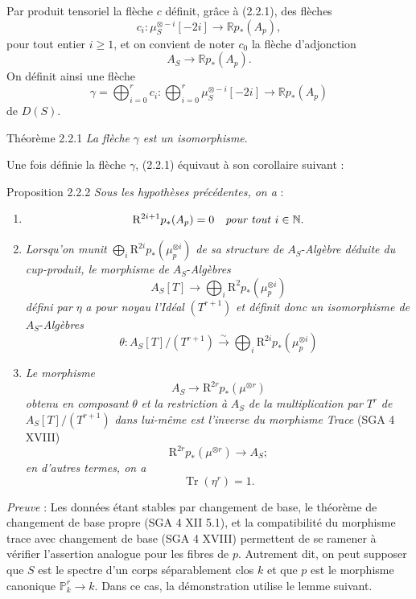 Par
produit tensoriel la flèche $c$ définit, grâce à (2.2.1), des flèches
\[
c_i:\mu_S^{\otimes -i}[-2i]\longrightarrow \mathbb{R} p_*(A_p),
\]
pour tout entier $i\ge1$, et on convient de noter $c_0$ la flèche d'adjonction
\[
A_S\longrightarrow \mathbb{R} p_*(A_p).
\]
On définit ainsi une flèche
\[
\gamma=\bigoplus_{i=0}^{r}c_i:
\bigoplus_{i=0}^{r}\mu_S^{\otimes -i}[-2i]\longrightarrow \mathbb{R} p_*(A_p)
\]
de $D(S)$.

\begin{statement}{Théorème 2.2.1}
\emph{La flèche} $\gamma$ \emph{est un isomorphisme}.
\end{statement}

Une fois définie la flèche $\gamma$, (2.2.1) équivaut à son corollaire suivant :

\begin{statement}{Proposition 2.2.2}
\emph{Sous les hypothèses précédentes, on a} :
\begin{enumerate}[label=\alph*)]
\item
\[
\mathrm{R}^{2i+1}p_*(A_p)=0\quad\text{\emph{pour tout} }i\in\mathbb{N}.
\]
\item \emph{Lorsqu'on munit} $\bigoplus_i \mathrm{R}^{2i}p_*(\mu_p^{\otimes i})$ \emph{de sa structure de} $A_S$-\emph{Algèbre déduite du cup-produit, le morphisme de} $A_S$-\emph{Algèbres}
\[
A_S[T]\longrightarrow \bigoplus_i \mathrm{R}^{2}p_*(\mu_p^{\otimes i})
\]
\emph{défini par} $\eta$ \emph{a pour noyau l'Idéal} $(T^{r+1})$ \emph{et définit donc un isomorphisme de} $A_S$-\emph{Algèbres}
\[
\theta:A_S[T]/(T^{r+1})\xrightarrow{\sim}\bigoplus_i \mathrm{R}^{2i}p_*(\mu_p^{\otimes i})
\]
\item \emph{Le morphisme}
\[
A_S\longrightarrow \mathrm{R}^{2r}p_*(\mu^{\otimes r})
\]
\emph{obtenu en composant} $\theta$ \emph{et la restriction à} $A_S$ \emph{de la multiplication par} $T^r$ \emph{de} $A_S[T]/(T^{r+1})$ \emph{dans lui-même est l'inverse du morphisme Trace} (SGA 4 XVIII)
\[
\mathrm{R}^{2r}p_*(\mu^{\otimes r})\longrightarrow A_S;
\]
\emph{en d'autres termes, on a}
\[
\operatorname{Tr}(\eta^r)=1.
\]
\end{enumerate}
\end{statement}

\emph{Preuve} : Les données étant stables par changement de base, le théorème de changement de base propre (SGA 4 XII 5.1), et la compatibilité du morphisme trace avec changement de base (SGA 4 XVIII) permettent de se ramener à vérifier l'assertion analogue pour les fibres de $p$. Autrement dit, on peut supposer que $S$ est le spectre d'un corps séparablement clos $k$ et que $p$ est le morphisme canonique $\mathbb{P}^r_k\to k$. Dans ce cas, la démonstration utilise le lemme suivant.

